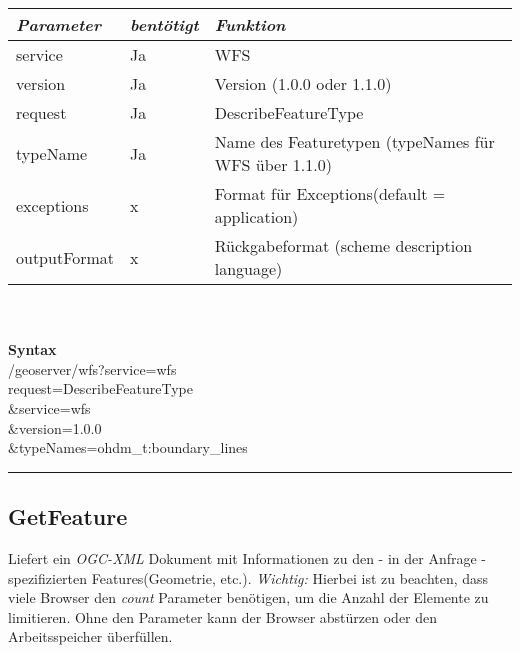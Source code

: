 \begin{tabular}{lll}
\emph{Parameter} & \emph{bentötigt} & \emph{Funktion} \\
\hline
service	& Ja & 	 WFS\\
\hline
version	& Ja &	 Version (1.0.0 oder 1.1.0)\\
\hline
request	& Ja &	DescribeFeatureType\\
\hline
typeName	& Ja &	Name des Featuretypen (typeNames für WFS über 1.1.0)\\
\hline
exceptions	& x 	& Format für Exceptions(default = application)\\
\hline
outputFormat &	x	 &  Rückgabeformat (scheme description language)\\
\hline
\end{tabular}\\
\vspace{2em}\\
\textbf{Syntax}\\
/geoserver/wfs?service=wfs\\
request=DescribeFeatureType\\
\&service=wfs\\
\&version=1.0.0\\
\&typeNames=ohdm\_t:boundary\_lines\\

\hrule
\subsection*{GetFeature}
Liefert ein \emph{OGC-XML} Dokument mit Informationen zu den - in der Anfrage - spezifizierten Features(Geometrie, etc.). \emph{Wichtig:} Hierbei ist zu beachten, dass viele Browser den \emph{count} Parameter benötigen, um die Anzahl der Elemente zu limitieren. Ohne den Parameter kann der Browser abstürzen oder den Arbeitsspeicher überfüllen.\\
\vspace{1em}\\


